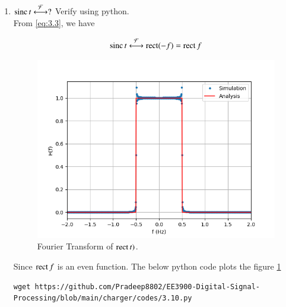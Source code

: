 \documentclass[journal,12pt,twocolumn]{IEEEtran}
\renewcommand\thesection{\arabic{section}}
\begin{document}
\begin{enumerate}[label=\thesection.\arabic*
	,ref=\thesection.\theenumi]
	\item $\mathop{\mathrm{sinc}}{t}\overset{\mathcal{F}}{ \longleftrightarrow} ?$  Verify using python.\\
	\solution From \eqref{eq:3.3}, we have 
	
	\begin{align}
		\mathop{\mathrm{sinc}}{t}\overset{\mathcal{F}}{ \longleftrightarrow}\mathop{\mathrm{rect}}(-f)=\mathop{\mathrm{rect}}{f}
		\label{eq:fourier-sinc}
	\end{align}
\begin{figure}[!ht]
	\includegraphics[width=\columnwidth]{figs/3.10.png}
	\caption{Fourier Transform of $\mathop{\mathrm{rect}}{t})$.}
	\label{fig:3.10}
\end{figure}
	Since $\mathop{\mathrm{rect}}{f}$ is an even function.
	The below python code plots the figure \ref{fig:3.10}
	\begin{lstlisting}
wget https://github.com/Pradeep8802/EE3900-Digital-Signal-Processing/blob/main/charger/codes/3.10.py
	\end{lstlisting} 

\end{enumerate}
\end{document}
